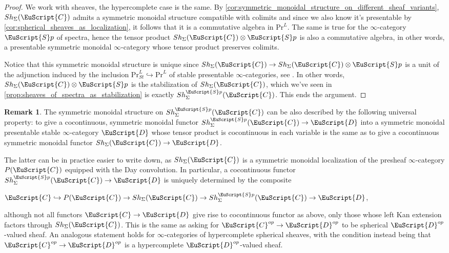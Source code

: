 \documentclass[oneside,a4paper]{amsart}
\newcommand{\euscr}[1]{\EuScript{#1}} %
\newcommand{\ccat}{\euscr{C}} %
\newcommand{\dcat}{\euscr{D}} %
\newcommand{\spectra}{\euscr{S}p} %
\theoremstyle{plain}
\theoremstyle{definition}
\newtheorem{rem}[thm]{Remark}
\theoremstyle{remark}
\begin{document}
\begin{proof}
We work with sheaves, the hypercomplete case is the same. By \cref{cor:symmetric_monoidal_structure_on_different_sheaf_variants}, $Sh_{\Sigma}(\ccat)$ admits a symmetric monoidal structure compatible with colimits and since we also know it's presentable by \cref{cor:spherical_sheaves_as_localization}, it follows that it is a commutative algebra in $\mathrm{Pr}^{L}$. The same is true for the $\infty$-category $\spectra$ of spectra, hence the tensor product $Sh_{\Sigma}(\ccat) \otimes \spectra$ is also a commutative algebra, in other words, a presentable symmetric monoidal $\infty$-category whose tensor product preserves colimits. 

Notice that this symmetric monoidal structure is unique since $Sh_{\Sigma}(\ccat) \rightarrow Sh_{\Sigma}(\ccat) \otimes \spectra$ is a unit of the adjunction induced by the inclusion $\mathrm{Pr}^{L}_{St} \hookrightarrow \mathrm{Pr}^{L}$ of stable presentable $\infty$-categories, see \cite[4.8.2.18]{higher_algebra}. In other words, $Sh_{\Sigma}(\ccat) \otimes \spectra$ is the stabilization of $Sh_{\Sigma}(\ccat)$, which we've seen in \cref{prop:sheaves_of_spectra_as_stabilization} is exactly $Sh^{\spectra}_{\Sigma}(\ccat)$. This ends the argument. 
\end{proof}

\begin{rem}
\label{rem:universal_property_of_spherical_sheaves_of_spectra}
The symmetric monoidal structure on $Sh_{\Sigma}^{\spectra}(\ccat)$ can be also described by the following universal property: to give a cocontinuous, symmetric monoidal functor $Sh_{\Sigma}^{\spectra}(\ccat) \rightarrow \dcat$ into a symmetric monoidal presentable stable $\infty$-category $\dcat$ whose tensor product is cocontinuous in each variable is the same as to give a cocontinuous symmetric monoidal functor $Sh_{\Sigma}(\ccat) \rightarrow \dcat$. 

The latter can be in practice easier to write down, as $Sh_{\Sigma}(\ccat)$ is a symmetric monoidal localization of the presheaf $\infty$-category $P(\ccat)$ equipped with the Day convolution. In particular, a cocontinuous functor $Sh^{\spectra}_{\Sigma}(\ccat) \rightarrow \dcat$ is uniquely determined by the composite

\begin{center}
$\ccat \hookrightarrow P(\ccat) \rightarrow Sh_{\Sigma}(\ccat) \rightarrow Sh^{\spectra}_{\Sigma}(\ccat) \rightarrow \dcat$,
\end{center}
although not all functors $\ccat \rightarrow \dcat$ give rise to cocontinuous functor as above, only those whose left Kan extension factors through $Sh_{\Sigma}(\ccat)$. This is the same as asking for $\ccat^{op} \rightarrow \dcat^{op}$ to be spherical $\dcat^{op}$-valued sheaf. An analogous statement holds for $\infty$-categories of hypercomplete spherical sheaves, with the condition instead being that $\ccat^{op} \rightarrow \dcat^{op}$ is a hypercomplete $\dcat^{op}$-valued sheaf. 
\end{rem}
\end{document}
